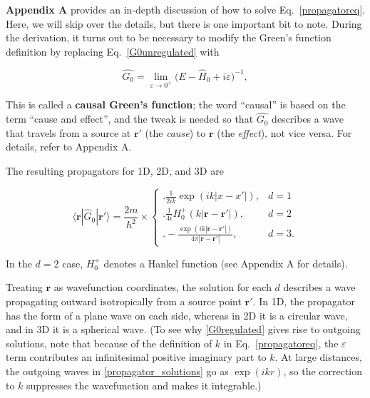 \documentclass[pra,12pt]{revtex4-2}
\begin{document}
\textbf{Appendix A} provides an in-depth discussion of how to solve
Eq.~\eqref{propagatoreq}.  Here, we will skip over the details, but
there is one important bit to note.  During the derivation, it turns
out to be necessary to modify the Green's function definition by
replacing Eq.~\eqref{G0unregulated} with
\begin{framed}
  \begin{equation}
    \hat{G_0} = \lim_{\varepsilon\rightarrow 0^+} \big(E - \hat{H}_0 + i \varepsilon\big)^{-1},
    \label{G0regulated}
  \end{equation}
\end{framed}
\vskip -0.1in
\noindent
This is called a \textbf{causal Green's function}; the word ``causal''
is based on the term ``cause and effect'', and the tweak is needed so
that $\hat{G_0}$ describes a wave that travels from a source at
$\mathbf{r}'$ (the \textit{cause}) to $\mathbf{r}$ (the
\textit{effect}), not vice versa.  For details, refer to Appendix A.


The resulting propagators for 1D, 2D,
and 3D are
\begin{framed}
  \begin{equation}
    \langle\mathbf{r}|\hat{G}_0|\mathbf{r}'\rangle = \frac{2m}{\hbar^2} \times \begin{cases} \Bigg.\displaystyle\frac{1}{2ik} \exp\left(ik|x-x'|\right),& d=1\\ \Bigg. \displaystyle\frac{1}{4i} H^+_0(k|\mathbf{r}-\mathbf{r'}|), & d=2 \\ \displaystyle \Bigg. - \frac{\exp\left(ik|\mathbf{r}-\mathbf{r}'|\right)}{4\pi|\mathbf{r}-\mathbf{r}'|}, & d = 3.  \end{cases}
    \label{propagator_solutions}
  \end{equation}
\end{framed}
\vskip -0.1in
\noindent
In the $d = 2$ case, $H_0^+$ denotes a Hankel function (see Appendix A
for details).

Treating $\mathbf{r}$ as wavefunction coordinates, the solution for
each $d$ describes a wave propagating outward isotropically from a
source point $\mathbf{r}'$.  In 1D, the propagator has the form of a
plane wave on each side, whereas in 2D it is a circular wave, and in
3D it is a spherical wave.  (To see why \eqref{G0regulated} gives rise
to outgoing solutions, note that because of the definition of $k$ in
Eq.~\eqref{propagatoreq}, the $\varepsilon$ term contributes an
infinitesimal positive imaginary part to $k$.  At large distances, the
outgoing waves in \eqref{propagator_solutions} go as $\exp(ikr)$, so
the correction to $k$ suppresses the wavefunction and makes it
integrable.)
\end{document}
